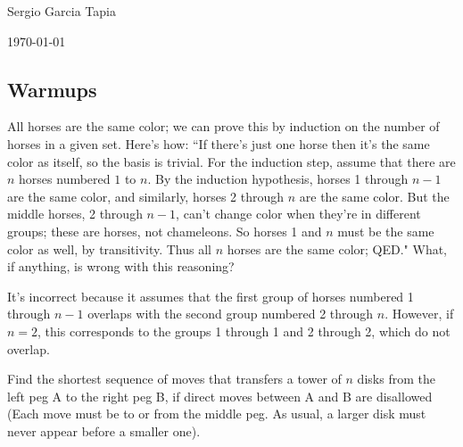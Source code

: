 \documentclass[12pt]{article}
\newenvironment{ex}[2][Exercise]{\begin{trivlist}
		\item[\hskip \labelsep {\bfseries #1}\hskip \labelsep {\bfseries #2.}]}{\end{trivlist}}
\newenvironment{sol}[1][Solution]{\begin{trivlist}
		\item[\hskip \labelsep {\bfseries #1:}]}{\end{trivlist}}
\begin{document}

\noindent Sergio Garcia Tapia \hfill

 \hfill 

 \hfill 

\noindent\today
\subsection*{Warmups}
\begin{ex}{1}
	All horses are the same color; we can prove this by induction on the number
	of horses in a given set. Here's how: ``If there's just one horse then it's the
	same color as itself, so the basis is trivial. For the induction step,
	assume that there are $n$ horses numbered $1$ to $n$. By the induction
	hypothesis, horses 1 through $n-1$ are the same color, and similarly,
	horses 2 through $n$ are the same color. But the middle horses, 2 through $n-1$,
	can't change color when they're in different groups; these are horses, not
	chameleons. So horses 1 and $n$ must be the same color as well, by transitivity.
	Thus all $n$ horses are the same color; QED." What, if anything, is wrong with this
	reasoning?
\end{ex}

\begin{sol}
	It's incorrect because it assumes that the first group of horses numbered
	1 through $n-1$ overlaps with the second group numbered 2 through $n$.
	However, if $n=2$, this corresponds to the groups 1 through 1 and 2 through 2,
	which do not overlap.
\end{sol}

\begin{ex}{2}
	Find the shortest sequence of moves that transfers a tower of $n$ disks
	from the left peg A to the right peg B, if direct moves between A and B
	are disallowed (Each move must be to or from the middle peg. As usual,
	a larger disk must never appear before a smaller one).
\end{ex}
\end{document}
